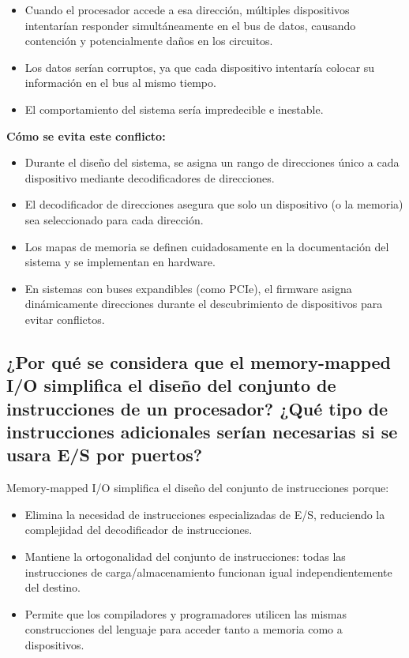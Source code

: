 \documentclass[12pt]{article}
\begin{document}
	\begin{itemize}
		\item Cuando el procesador accede a esa dirección, múltiples dispositivos intentarían responder simultáneamente en el bus de datos, causando contención y potencialmente daños en los circuitos.
		\item Los datos serían corruptos, ya que cada dispositivo intentaría colocar su información en el bus al mismo tiempo.
		\item El comportamiento del sistema sería impredecible e inestable.
	\end{itemize}
	
	\textbf{Cómo se evita este conflicto:}
	\begin{itemize}
		\item Durante el diseño del sistema, se asigna un rango de direcciones único a cada dispositivo mediante decodificadores de direcciones.
		\item El decodificador de direcciones asegura que solo un dispositivo (o la memoria) sea seleccionado para cada dirección.
		\item Los mapas de memoria se definen cuidadosamente en la documentación del sistema y se implementan en hardware.
		\item En sistemas con buses expandibles (como PCIe), el firmware asigna dinámicamente direcciones durante el descubrimiento de dispositivos para evitar conflictos.
	\end{itemize}
	
	\subsection{¿Por qué se considera que el memory-mapped I/O simplifica el diseño del conjunto de instrucciones de un procesador? ¿Qué tipo de instrucciones adicionales serían necesarias si se usara E/S por puertos?}
	
	Memory-mapped I/O simplifica el diseño del conjunto de instrucciones porque:
	
	\begin{itemize}
		\item Elimina la necesidad de instrucciones especializadas de E/S, reduciendo la complejidad del decodificador de instrucciones.
		\item Mantiene la ortogonalidad del conjunto de instrucciones: todas las instrucciones de carga/almacenamiento funcionan igual independientemente del destino.
		\item Permite que los compiladores y programadores utilicen las mismas construcciones del lenguaje para acceder tanto a memoria como a dispositivos.
	\end{itemize}
	
\end{document}
